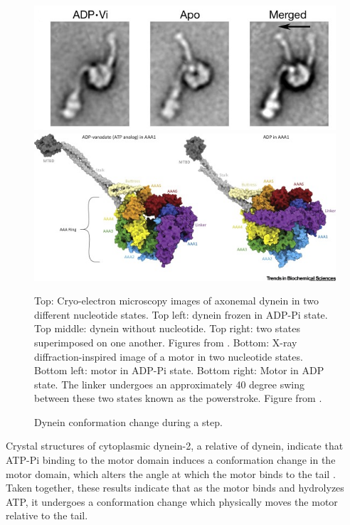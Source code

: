 \documentclass[
11pt, %
english, %
singlespacing, %
headsepline, %
chapterinoneline, %
]{MastersDoctoralThesis} %
\begin{document}
\begin{figure}[h]
  \centering
  \includegraphics[width=.65\textwidth,keepaspectratio]{../../figures/burgess-dynein-angles}\\
  \hspace{1cm}
  \includegraphics[width=.95\textwidth,keepaspectratio]{../../figures/linker-swing}
  \caption{Dynein conformation change during a step.}{Top: Cryo-electron microscopy images of axonemal dynein in two different nucleotide states. Top left: dynein frozen in ADP-Pi state. Top middle: dynein without nucleotide. Top right: two states superimposed on one another. Figures from \cite{burgess-paper}. Bottom: X-ray diffraction-inspired image of a motor in two nucleotide states. Bottom left: motor in ADP-Pi state. Bottom right: Motor in ADP state. The linker undergoes an approximately 40 degree swing between these two states known as the powerstroke. Figure from \cite{bhabha-paper}.}
  \label{fig:cryo-em-angles}
\end{figure}

Crystal structures of cytoplasmic dynein-2, a relative of dynein, indicate that ATP-Pi binding to the motor domain induces a conformation change in the motor domain, which alters the angle at which the motor binds to the tail \cite{carter-paper}. Taken together, these results indicate that as the motor binds and hydrolyzes ATP, it undergoes a conformation change which physically moves the motor relative to the tail.\\

\end{document}

